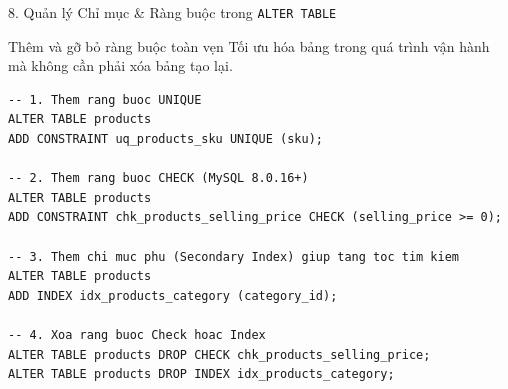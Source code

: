 \documentclass[aspectratio=169,11pt]{beamer}
\begin{document}
\begin{frame}[fragile]{8. Quản lý Chỉ mục \& Ràng buộc trong \texttt{ALTER TABLE}}
\begin{block}{Thêm và gỡ bỏ ràng buộc toàn vẹn}
  Tối ưu hóa bảng trong quá trình vận hành mà không cần phải xóa bảng tạo lại.
\end{block}

\begin{lstlisting}
-- 1. Them rang buoc UNIQUE
ALTER TABLE products
ADD CONSTRAINT uq_products_sku UNIQUE (sku);

-- 2. Them rang buoc CHECK (MySQL 8.0.16+)
ALTER TABLE products
ADD CONSTRAINT chk_products_selling_price CHECK (selling_price >= 0);

-- 3. Them chi muc phu (Secondary Index) giup tang toc tim kiem
ALTER TABLE products
ADD INDEX idx_products_category (category_id);

-- 4. Xoa rang buoc Check hoac Index
ALTER TABLE products DROP CHECK chk_products_selling_price;
ALTER TABLE products DROP INDEX idx_products_category;
\end{lstlisting}
\end{frame}

\end{document}
